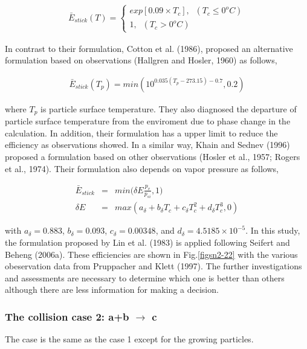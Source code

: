 \begin{eqnarray}
\bar{E}_{stick}(T)=
\left\{
\begin{array}{l}
exp[0.09\times T_{c}],\;\;(T_{c}\leq 0^{o}C) \\
1,\;\;(T_{c}> 0^{o}C)
\label{sn185}
\end{array}
\right.
\end{eqnarray}

In contrast to their formulation, Cotton et al. (1986), proposed an alternative formulation based on observations (Hallgren and Hosler, 1960) as follows,

\begin{eqnarray}
\bar{E}_{stick}(T_{p})=min(10^{0.035(T_{p}-273.15)-0.7},0.2)\label{sn186}
\end{eqnarray}

where $T_{p}$ is particle surface temperature. They also diagnosed the departure of particle surface temperature from the enviroment due to phase change in the calculation. In addition, their formulation has a upper limit to reduce the efficiency as observations showed. In a similar way, Khain and Sednev (1996) proposed a formulation based on other observations (Hosler et al., 1957; Rogers et al., 1974). Their formulation also depends on vapor pressure as follows,

\begin{eqnarray}
\bar{E}_{stick}&=&min\bigl(\delta E\frac{p_{v}}{p_{si}},1\bigr)\label{sn187}\\
\delta E&=&max(a_{\delta}+b_{\delta}T_{c}+c_{\delta}T_{c}^{2}+d_{\delta}T_{c}^{3},0)\label{sn188}
\end{eqnarray}

with $a_{\delta} = 0.883$, $b_{\delta} = 0.093$, $c_{\delta} = 0.00348$, and $d_{\delta} = 4.5185 \times 10^{-5}$. In this study, the formulation proposed by Lin et al. (1983) is applied following Seifert and Beheng (2006a). These efficiencies are shown in Fig.\ref{figsn2-22} with the various obeservation data from Pruppacher and Klett (1997). The further investigations and assessments are necessary to determine which one is better than others although there are less information for making a decision.


\subsubsection{The collision case 2: a+b $\rightarrow$ c}
 The case is the same as the case 1 except for the growing particles.

